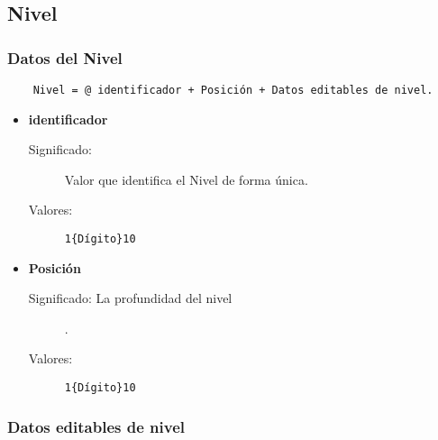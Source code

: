 \subsection{Nivel}
\label{dd:Nivel}

\subsubsection{Datos del Nivel}
\begin{lstlisting}
	Nivel = @ identificador + Posición + Datos editables de nivel.
\end{lstlisting}
\begin{itemize}
	\item	\textbf{identificador}
		\begin{description}
			\item [Significado:] Valor que identifica el Nivel de forma única.
			\item [Valores:]{\begin{lstlisting}
1{Dígito}10\end{lstlisting}}
		\end{description}
\item	\textbf{Posición}
		\begin{description}
			\item [Significado: La profundidad del nivel].
			\item [Valores:]{\begin{lstlisting}
1{Dígito}10\end{lstlisting}}
		\end{description}
\end{itemize}

\subsubsection{Datos editables de nivel}
\label{dd:DatosEditablesNivel}

